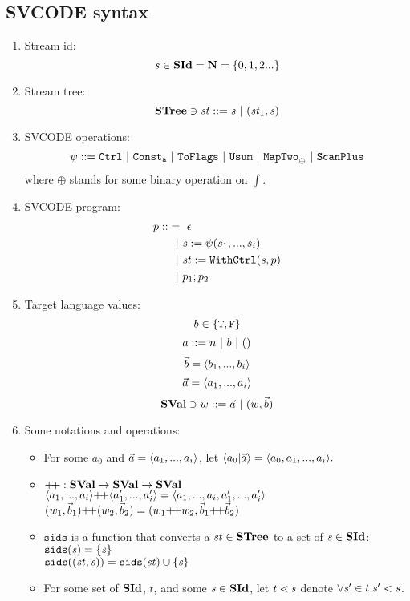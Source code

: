 \subsection{SVCODE syntax}
\begin{enumerate}[(1)]
\item Stream id: $$\mathit{s} \in \mathbf{SId} = \mathbf{N} = \{0,1,2...\}$$

\item Stream tree: $$ \STree \ni \st ::= \s \ | \ (\st_1,\s) $$
\item SVCODE operations: $$\psi ::= \ctrl \ | \ \consta{a} \ | \ \toflag
\ | \ \usum \ | \ \maptwo{\oplus} \ | \ \scan $$
where $\oplus$ stands for some binary operation on $\int$. \\


\item SVCODE program: 
\begin{align*}
	p :: & = \ \epsilon \\
	     &\ \ | \ \mathit{s} := \psi(s_1,...,s_i) \\
	     &\ \ | \ \mathit{st} := \mathtt{WithCtrl}(\mathit{s},p) \\
	     &\ \ | \ p_1;p_2 	 
\end{align*}


\item Target language values: 
$$b \in \{\mathtt{T},\mathtt{F} \}$$
$$ a ::= n \ | \ b \ | \ \unit$$
$$\vec b = \langle b_1,...,b_i \rangle$$ 
$$\vec a = \langle a_1,...,a_i \rangle  $$
$$\mathbf{SVal} \ni w ::= \vec a \ | \ (w,\vec b) $$

\item Some notations and operations:
\begin{itemize}
	\item For some $a_0$ and $\a = \< a_1,...,a_i \'>$, let $\< a_0 | \a \'>  = \< a_0,a_1,...,a_i \'>. $ 

	\item $\++: \SVal \->  \SVal \-> \SVal$ \\
	  $\vapp{\vrange{a_1}{a_i}} {\vrange{a_1'}{a_i'}} = \langle a_1,...,a_i,a_1',...,a_i' \rangle $ \\
	  $\vapp{(\v_1,\b_1)}{(\v_2,\b_2)} = (\vapp{\v_1}{\v_2}, \vapp{\b_1}{\b_2})$

	\item $\texttt{sids}$ is a function that converts a $\mathit{st} \in \mathbf{STree}$ to a set of $\mathit{s} \in \mathbf{SId}$: \\
	$\mathtt{sids}(\mathit{s}) = \{\mathit{s}\}$ \\
	$\mathtt{sids}((\mathit{st},\mathit{s})) = \mathtt{sids}(\mathit{st}) \cup \{\mathit{s}\}$ 
   
    \item 
    For some set of $\mathbf{SId}$, $t$, and some $\mathit{s} \in \mathbf{SId}$, let $t \lessdot \mathit{s}$ denote $\forall \mathit{s}' \in t. \mathit{s}' < \mathit{s}$.

\end{itemize}

\end{enumerate}


